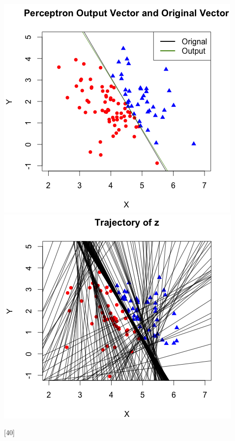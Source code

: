 \documentclass[]{../util/ColumbiaAssm}
\begin{document}
\begin{questions}
%
%


\begin{solution}
\\\includegraphics[scale=0.725]{PVvsOV}
\\\includegraphics[scale=0.725]{TraZ}
\end{solution}

[40]


\end{questions}
\end{document}
